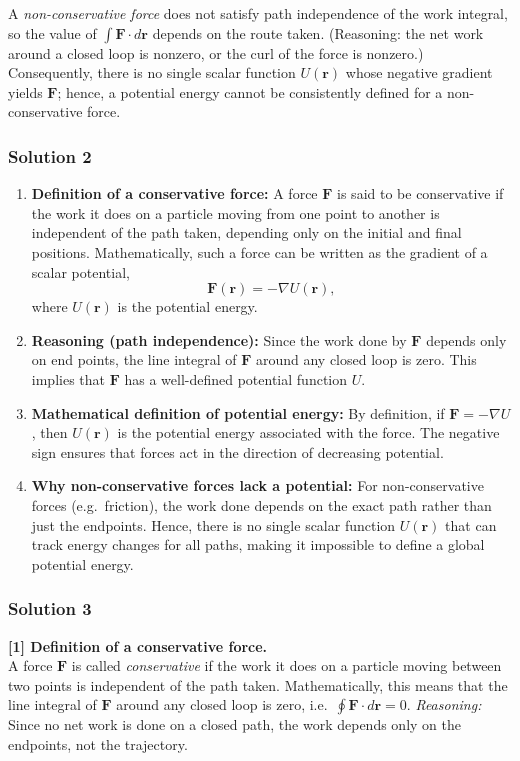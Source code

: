 \documentclass{article}
\begin{document}
A \emph{non-conservative force} does not satisfy path independence of the work integral, so the value of $\int \mathbf{F} \cdot d\mathbf{r}$ depends on the route taken. (Reasoning: the net work around a closed loop is nonzero, or the curl of the force is nonzero.) Consequently, there is no single scalar function $U(\mathbf{r})$ whose negative gradient yields $\mathbf{F}$; hence, a potential energy cannot be consistently defined for a non-conservative force.

\subsubsection{Solution 2}

\begin{enumerate}
\item \textbf{Definition of a conservative force:} 
A force \(\mathbf{F}\) is said to be conservative if the work it does on a particle moving from one point to another is independent of the path taken, depending only on the initial and final positions. Mathematically, such a force can be written as the gradient of a scalar potential,
\[
\mathbf{F}(\mathbf{r}) = -\nabla U(\mathbf{r}),
\]
where \(U(\mathbf{r})\) is the potential energy.

\item \textbf{Reasoning (path independence):}
Since the work done by \(\mathbf{F}\) depends only on end points, the line integral of \(\mathbf{F}\) around any closed loop is zero. This implies that \(\mathbf{F}\) has a well-defined potential function \(U\).

\item \textbf{Mathematical definition of potential energy:}
By definition, if \(\mathbf{F} = -\nabla U\), then \(U(\mathbf{r})\) is the potential energy associated with the force. The negative sign ensures that forces act in the direction of decreasing potential.

\item \textbf{Why non-conservative forces lack a potential:}
For non-conservative forces (e.g.\ friction), the work done depends on the exact path rather than just the endpoints. Hence, there is no single scalar function \(U(\mathbf{r})\) that can track energy changes for all paths, making it impossible to define a global potential energy.
\end{enumerate}


\subsubsection{Solution 3}
\textbf{[1] Definition of a conservative force.}\\
A force $\mathbf{F}$ is called \emph{conservative} if the work it does on a particle moving between two points is independent of the path taken. Mathematically, this means that the line integral of $\mathbf{F}$ around any closed loop is zero, i.e.\ $\oint \mathbf{F}\cdot d\mathbf{r} = 0$. 
\emph{Reasoning:} Since no net work is done on a closed path, the work depends only on the endpoints, not the trajectory.
\end{document}
